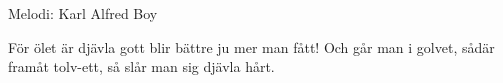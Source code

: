 \begin{song}

\begin{songmeta}
Melodi: Karl Alfred Boy
\end{songmeta}

\begin{songtext}
För ölet är djävla gott
blir bättre ju mer man fått!
Och går man i golvet,
sådär framåt tolv-ett,
så slår man sig djävla hårt.
\end{songtext}

\end{song}
